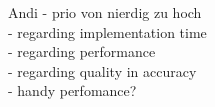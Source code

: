  Andi
- prio von nierdig zu hoch \\
- regarding implementation time \\
- regarding performance \\
- regarding quality in accuracy \\
- handy perfomance? \\
